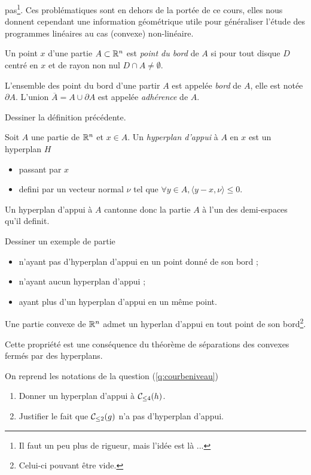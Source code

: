 \documentclass[11pt, a4paper]{article}
\begin{document}
pas\footnote{Il faut un peu plus de rigueur, mais l'idée est là
  ...}. Ces problématiques sont en dehors de la portée de ce cours,
elles nous donnent cependant une information géométrique utile pour
généraliser l'étude des programmes linéaires au cas (convexe)
non-linéaire.
\begin{defn}
  Un point $x$ d'une partie $A \subset \mathbb{R}^n$ est \emph{point du bord}
  de $A$ si pour tout disque $D$ centré en $x$ et de rayon non nul
  $D \cap A \neq \emptyset$.

  L'ensemble des point du bord d'une partir $A$ est appelée
  \emph{bord} de $A$, elle est notée $\partial A$. L'union
  $\overline{A} = A \cup \partial A$ est appelée \emph{adhérence} de
  $A$.
\end{defn}
\begin{question}
  Dessiner la définition précédente.
\end{question}
\begin{defn}
  Soit $A$ une partie de $\mathbb{R}^n$ et $x \in A$. Un \emph{hyperplan
    d'appui} à $A$ en $x$ est un hyperplan $H$
  \begin{itemize}
  \item passant par $x$
  \item defini par un vecteur normal $\nu$ tel que
    $\forall y \in A, \langle y-x, \nu \rangle \leq 0$.
  \end{itemize}
\end{defn}
Un hyperplan d'appui à $A$ cantonne donc la partie $A$ à l'un des
demi-espaces qu'il definit.
\begin{question}
  Dessiner un exemple de partie
  \begin{itemize}
  \item n'ayant pas d'hyperplan d'appui en un point donné de son bord ;
  \item n'ayant aucun hyperplan d'appui ;
  \item ayant plus d'un hyperplan d'appui en un même point.
  \end{itemize}
\end{question}
\begin{prop}
  Une partie convexe de $\mathbb{R}^n$ admet un hyperlan d'appui en tout point
  de son bord\footnote{Celui-ci pouvant être vide.}.
\end{prop}
Cette propriété est une conséquence du théorème de séparations des
convexes fermés par des hyperplans.
\begin{question}
  On reprend les notations de la question (\ref{q:courbeniveau})
  \begin{enumerate}
  \item Donner un hyperplan d'appui à $\mathcal{C}_{\leq 4}(h)$.
  \item Justifier le fait que $\mathcal{C}_{\leq 2}(g)$ n'a pas d'hyperplan
    d'appui.
  \end{enumerate}
\end{question}
\end{document}
